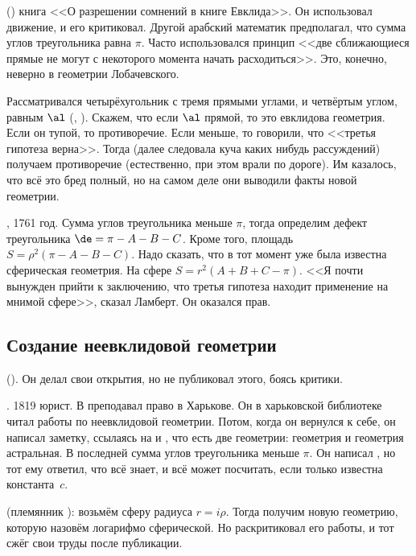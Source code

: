 \documentclass[a4paper,oneside,fleqn,10pt]{article}
\begin{document}
 () книга <<О разрешении сомнений в
книге Евклида>>.  Он использовал движение, и  его критиковал.  Другой арабский математик 
предполагал, что сумма углов треугольника равна $\pi$.  Часто
использовался принцип <<две сближающиеся прямые не могут с некоторого
момента начать расходиться>>. Это, конечно, неверно в геометрии
Лобачевского.

Рассматривался четырёхугольник с тремя прямыми углами, и четвёртым
углом, равным $\al$ (, ).  Скажем, что
если $\al$ прямой, то это евклидова геометрия.  Если он тупой, то
противоречие. Если меньше, то говорили, что <<третья гипотеза верна>>.
Тогда (далее следовала куча каких нибудь рассуждений) получаем
противоречие (естественно, при этом врали по дороге).  Им казалось,
что всё это бред полный, но на самом деле они выводили факты новой
геометрии.

, 1761 год. Сумма углов треугольника меньше $\pi$, тогда
определим дефект треугольника $\de = \pi - A - B - C$. Кроме того,
площадь $S = \rho^2(\pi - A - B - C)$.  Надо сказать, что в тот момент
уже была известна сферическая геометрия. На сфере $S = r^2(A + B + C -
\pi)$.  <<Я почти вынужден прийти к заключению, что третья гипотеза
находит применение на мнимой сфере>>, сказал Ламберт. Он оказался
прав.

\subsection{Создание неевклидовой геометрии}

 (). Он
делал свои открытия, но не публиковал этого, боясь критики.

. 1819 юрист. В  преподавал право в
Харькове.  Он в харьковской библиотеке читал работы
 по неевклидовой геометрии.  Потом, когда он
вернулся к себе, он написал заметку, ссылаясь на  и
, что есть две геометрии: геометрия
 и геометрия астральная.  В последней сумма
углов треугольника меньше $\pi$. Он написал , но
тот ему ответил, что всё знает, и всё может посчитать, если только
известна константа~$c$.

 (племянник ): возьмём сферу
радиуса $r = i\rho$. Тогда получим новую геометрию, которую назовём
логарифмо сферической. Но  раскритиковал его работы, и тот
сжёг свои труды после публикации.
\end{document}

